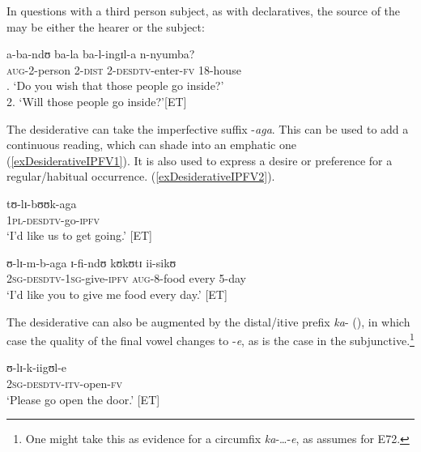 In questions with a third person subject, as with declaratives, the source of the  may be either the hearer or the subject:

\begin{exe}
\ex
\gll a-ba-ndʊ ba-la ba-l-ingɪl-a n-nyumba?\\
\textsc{aug}-2-person 2-\textsc{dist} 2-\textsc{desdtv}-enter-\textsc{fv} 18-house\\
. \lq Do you wish that those people go inside?'\\
2. \lq Will those people go inside?'[ET]
\end{exe}
 
The desiderative can take the imperfective suffix -\textit{aga}. This can be used to add a continuous reading, which can shade into an emphatic one (\ref{exDesiderativeIPFV1}). It is also used to express a desire or preference for a regular/habitual occurrence. (\ref{exDesiderativeIPFV2}).

\begin{exe}
\ex \label{exDesiderativeIPFV1}\gll tʊ-lɪ-bʊʊk-aga\\
\textsc{1pl}-\textsc{desdtv}-go-\textsc{ipfv}\\
\glt \lq I'd like us to get going.' [ET] %

\ex \label{exDesiderativeIPFV2} \gll ʊ-lɪ-m-b-aga ɪ-fi-ndʊ kʊkʊtɪ ii-sikʊ\\
\textsc{2sg}-\textsc{desdtv}-\textsc{1sg}-give-\textsc{ipfv} \textsc{aug}-8-food every 5-day\\
\glt \lq I'd like you to give me food every day.' [ET] %
\end{exe}

The desiderative can also be augmented by the distal/itive prefix \textit{ka}- (), in which case the quality of the final vowel changes to -\textit{e}, as is the case in the subjunctive.\footnote{One might take this as evidence for a circumfix \textit{ka}-\ldots-\textit{e}, as \citet{NicolleS2002} assumes for  E72.}

\begin{exe}
\ex \gll ʊ-lɪ-k-iigʊl-e\\
\textsc{2sg}-\textsc{desdtv}-\textsc{itv}-open-\textsc{fv}\\
\glt `Please go open the door.' [ET]
\end{exe}

